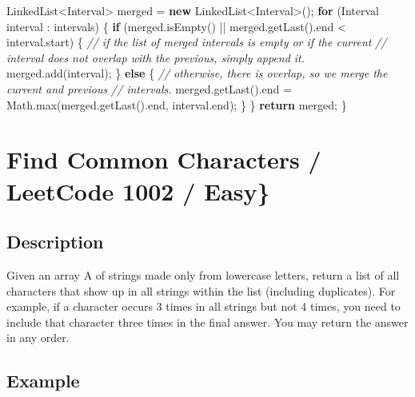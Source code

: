 \documentclass[]{book}
\newenvironment{Shaded}{\begin{snugshade}}{\end{snugshade}}
\newcommand{\BuiltInTok}[1]{#1}
\newcommand{\CommentTok}[1]{\textcolor[rgb]{0.56,0.35,0.01}{\textit{#1}}}
\newcommand{\FunctionTok}[1]{\textcolor[rgb]{0.00,0.00,0.00}{#1}}
\newcommand{\KeywordTok}[1]{\textcolor[rgb]{0.13,0.29,0.53}{\textbf{#1}}}
\newcommand{\NormalTok}[1]{#1}
\begin{document}
\begin{Shaded}
\begin{Highlighting}[]
    \BuiltInTok{LinkedList}\NormalTok{<Interval> merged = }\KeywordTok{new} \BuiltInTok{LinkedList}\NormalTok{<Interval>();}
    \KeywordTok{for}\NormalTok{ (Interval interval : intervals) \{}
        \KeywordTok{if}\NormalTok{ (merged.}\FunctionTok{isEmpty}\NormalTok{() || merged.}\FunctionTok{getLast}\NormalTok{().}\FunctionTok{end}\NormalTok{ < interval.}\FunctionTok{start}\NormalTok{) \{}
            \CommentTok{// if the list of merged intervals is empty or if the current}
            \CommentTok{// interval does not overlap with the previous, simply append it.}
\NormalTok{            merged.}\FunctionTok{add}\NormalTok{(interval);}
\NormalTok{        \} }\KeywordTok{else}\NormalTok{ \{}
            \CommentTok{// otherwise, there is overlap, so we merge the current and previous}
            \CommentTok{// intervals.}
\NormalTok{            merged.}\FunctionTok{getLast}\NormalTok{().}\FunctionTok{end}\NormalTok{ = }\BuiltInTok{Math}\NormalTok{.}\FunctionTok{max}\NormalTok{(merged.}\FunctionTok{getLast}\NormalTok{().}\FunctionTok{end}\NormalTok{, interval.}\FunctionTok{end}\NormalTok{);}
\NormalTok{        \}}
\NormalTok{    \}}
    \KeywordTok{return}\NormalTok{ merged;}
\NormalTok{\}}
\end{Highlighting}
\end{Shaded}

\hypertarget{find-common-characters-leetcode-1002-easy}{%
\section{Find Common Characters / LeetCode 1002 / Easy\}}\label{find-common-characters-leetcode-1002-easy}}

\hypertarget{description-23}{%
\subsection{Description}\label{description-23}}

Given an array A of strings made only from lowercase letters, return a list of all characters that show up in all
strings within the list (including duplicates). For example, if a character occurs 3 times in all strings but
not 4 times, you need to include that character three times in the final answer. You may return the answer in
any order.

\hypertarget{example-22}{%
\subsection{Example}\label{example-22}}
\end{document}
